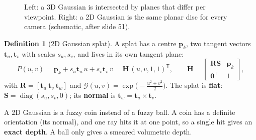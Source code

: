 \documentclass[11pt,a4paper]{article}
\newcommand{\blob}[6]{\begin{scope}[shift={(#1,#2)},rotate=#5]
  \shade[inner color=#6,outer color=#6!4] (0,0) ellipse (#3 and #4);\end{scope}}
\newcommand{\T}{^{\mathsf T}}
\newcommand{\G}{\mathcal{G}}
\DeclareMathOperator{\diag}{diag}
\theoremstyle{definition}
\newtheorem{definition}{Definition}[section]
\theoremstyle{plain}
\theoremstyle{remark}
\begin{document}
\begin{figure}[htbp]
\centering
{}
\caption{Left: a 3D Gaussian is intersected by planes that differ per viewpoint. Right: a 2D Gaussian is the same planar disc for every camera (schematic, after slide 51).}
\end{figure}

\begin{definition}[2D Gaussian splat]
A splat has a centre $\bm p_k$, two tangent vectors $\bm t_u,\bm t_v$ with scales $s_u,s_v$, and lives in its own tangent plane:
\[
P(u,v)=\bm p_k+s_u\bm t_u\,u+s_v\bm t_v\,v=\bm H\,(u,v,1,1)\T,\qquad
\bm H=\begin{bmatrix}\bm R\bm S&\bm p_k\\\bm 0\T&1\end{bmatrix},
\]
with $\bm R=[\bm t_u\ \bm t_v\ \bm t_w]$ and $\G(u,v)=\exp\!\big(-\tfrac{u^2+v^2}{2}\big)$. The splat is \textbf{flat}: $\bm S=\diag(s_u,s_v,0)$; its \textbf{normal} is $\bm t_w=\bm t_u\times\bm t_v$.
\end{definition}

\begin{intuition}
A 2D Gaussian is a fuzzy coin instead of a fuzzy ball. A coin has a definite orientation (its normal), and one ray hits it at one point, so a single hit gives an \textbf{exact depth}. A ball only gives a smeared volumetric depth.
\end{intuition}
\end{document}

